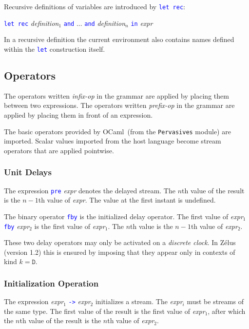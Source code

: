 \documentclass[11pt,titlepage,twoside]{report}
\newcommand{\zelus}{{\sf Z\'elus}}
\newcommand{\ocaml}{{\sf OCaml}}
\newcommand{\Let}{\mbox{{\tt let}}}
\newcommand{\Rec}{\mbox{{\tt rec}}}
\newcommand{\In}{\mbox{{\tt in}}}
\newcommand{\AND}{\mbox{{\tt and}}}
\newcommand{\Pre}{\mbox{{\tt pre}}}
\newcommand{\Fby}{\mbox{{\tt fby}}}
\newcommand{\Minusgreater}{\mbox{{\tt ->}}}
\newcommand{\term}[1]{\textcolor{Blue}{\tt #1}}
\newcommand{\nterm}[1]{\textcolor{BrickRed}{\it #1}}
\newcommand{\term}[1]{{\tt #1}}
\newcommand{\nterm}[1]{{\em #1}}
\newcommand{\NodeKind}{\ensuremath{\mathtt{D}}}
\begin{document}
Recursive definitions of variables are introduced by \term{\Let\ \Rec}:
\begin{center}
  \term{\Let\ \Rec} \nterm{definition}$_1$ \term{\AND} ... 
  \term{\AND} \nterm{definition}$_n$ \term{\In} \nterm{expr}
\end{center}

In a recursive definition the current environment also contains names 
defined within the \term{\Let} construction itself.

\subsection{Operators\label{operators}} %

The operators written \nterm{infix-op} in the grammar are applied by placing 
them between two expressions.
The operators written \nterm{prefix-op} in the grammar are applied by 
placing them in front of an expression.

The basic operators provided by \ocaml\ (from the {\tt Pervasives}
module) are imported. Scalar values imported from the
host language become stream operators that are applied
pointwise.

\subsubsection{Unit Delays} %

The expression \term{\Pre} \nterm{expr} denotes the delayed
stream. The $n$th value of the result is the $n-1$th
value of \nterm{expr}. The value at the first instant is undefined.

The binary operator \term{\Fby} is the initialized delay operator. The
first value of \nterm{expr}$_1$ \term{\Fby} \nterm{expr}$_2$ is the
first value of \nterm{expr}$_1$. The $n$th value is the $n-1$th
value of \nterm{expr}$_2$.

These two delay operators may only be activated on a \emph{discrete clock}. 
In \zelus{} (version 1.2) this is ensured by imposing that they appear only 
in contexts of kind $k = \NodeKind$.

\subsubsection{Initialization Operation} %

The expression \nterm{expr}$_1$ \term{\Minusgreater} \nterm{expr}$_2$ 
initializes a stream.
The \nterm{expr}$_i$ must be streams of the same type. The
first value of the result is the first value of
\nterm{expr}$_1$, after which the $n$th value of the result is the $n$th
value of \nterm{expr}$_2$.
\end{document}
